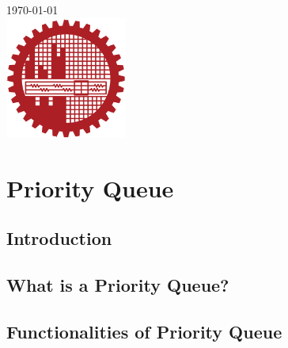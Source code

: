 \documentclass{report}
\begin{document}
\begin{titlepage}


{\large \today}\\[2cm] %


    \vfill
    \includegraphics[width=4cm]{runner/BUET.png}%
    \vfill
    \vfill
\end{titlepage}




\newpage 

\tableofcontents

\chapter{Priority Queue}
\section{Introduction}


\newpage
\section{What is a Priority Queue?}


\newpage
\section{Functionalities of Priority Queue}

\end{document}
